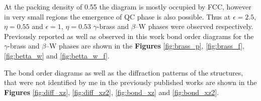 At the packing density of 0.55 the diagram is mostly occupied by FCC, however %
in very small regions the emergence of QC phase is also possible.
Thus at $\epsilon=2.5$, $\eta=0.55$ and  $\epsilon=1$, $\eta=0.53$  $\gamma$-brass and $\beta$--W phases were observed respectively. Previously reported as well as observed in this work bond order diagrams for the $\gamma$-brass and $\beta$--W phases\cite{engelscience} are shown in the \textbf{Figures} \ref{fig:brass_p}, \ref{fig:brass_f}, \ref{fig:betta_w} and \ref{fig:betta_w_f}.

The bond order diagrams as well as the diffraction patterns of the structures, that were not identified by me in the previously published works are shown in the \textbf{Figures} \ref{fig:diff_xz}, \ref{fig:diff_xz2}, \ref{fig:bond_xz} and \ref{fig:bond_xz2}.





